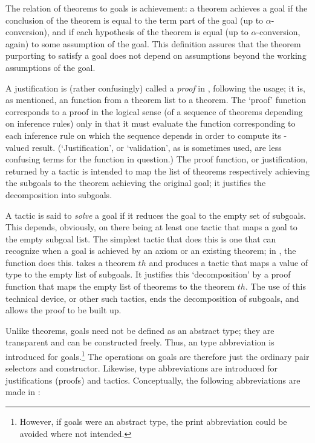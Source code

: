 The relation of theorems to goals is achievement:
a theorem achieves a goal if the conclusion of the theorem
is equal to the term part of the goal (up to $\alpha$-conversion), and
if each hypothesis of the theorem is equal (up to $\alpha$-conversion,
again) to some assumption of the goal. This definition assures that
the theorem purporting to satisfy a goal does not depend on
assumptions beyond the working assumptions of the goal.

A justification is (rather confusingly) called
a {\it proof\/}
in \HOL{}, following the \LCF{} usage; it is, as mentioned,
an \ML{} function
from a theorem list to a theorem.  The \ML{} `proof' function
corresponds to a proof
 in the
logical sense (of a sequence of theorems depending on inference rules)
only in that it must
evaluate the \ML{} function corresponding
to each inference rule on which the sequence depends
in order to compute its -valued result. (`Justification', or
`validation',
 as is sometimes used, are less confusing terms for
the \ML{} function in question.)
The proof function, or justification, returned by a tactic is intended to map the
list of theorems respectively achieving the subgoals to the
theorem achieving the original goal; it justifies the decomposition
into subgoals.

A tactic is said to {\it solve\/}
 a goal if it reduces the goal to the
empty set of subgoals.
This depends, obviously, on there being at least one
tactic that maps a goal to the empty subgoal list.  The simplest
tactic that does this is one that can recognize when a goal is
achieved by an axiom or an existing theorem; in \HOL, the function
 does this.  takes a theorem $th$
and produces a tactic that maps a value
of type  to the empty list of subgoals. It justifies this
`decomposition' by a proof function that maps the empty list of theorems
to the theorem $th$. The use of this technical device, or other
such tactics, ends the decomposition of subgoals, and allows the proof
to be built up.

Unlike theorems, goals need not be defined as an abstract type; they
are transparent and can be constructed freely. Thus, an \ML{} type
abbreviation is introduced for goals.\footnote{However, if goals were
  an abstract type, the print abbreviation could be avoided where not
  intended.}  The operations on goals are therefore just the ordinary
pair selectors and constructor.
Likewise, type abbreviations are introduced for justifications
(proofs) and tactics. Conceptually, the following abbreviations are
made in \HOL:

